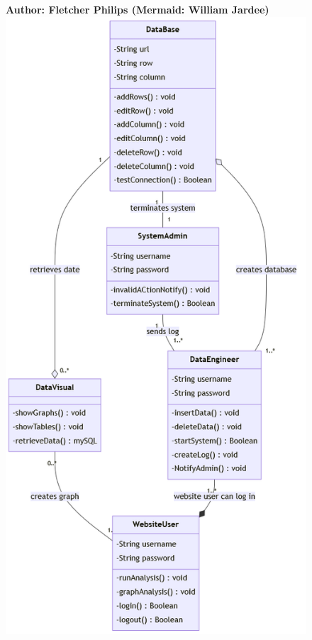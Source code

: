 \documentclass[11pt]{article}
\begin{document}
\begin{figure}[!ht]
\centering
\textbf{Author: Fletcher Philips (Mermaid: William Jardee)}
	\includegraphics[height=0.6\paperheight]{./Class Diagrams/ColdCaseClassDiagram_mermaid.png}\\

\end{figure}
\end{document}

